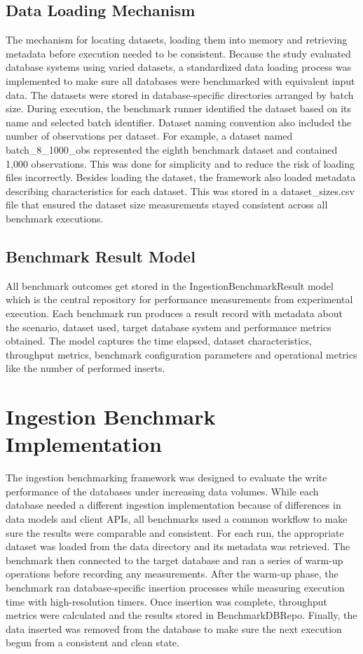 \subsection{Data Loading Mechanism}
The mechanism for locating datasets, loading them into memory and retrieving metadata before execution needed to be consistent. Because the study evaluated database systems using varied datasets, a standardized data loading process was implemented to make sure all databases were benchmarked with equivalent input data. The datasets were stored in database-specific directories arranged by batch size. During execution, the benchmark runner identified the dataset based on its name and selected batch identifier. Dataset naming convention also included the number of observations per dataset. For example, a dataset named batch\_8\_1000\_obs represented the eighth benchmark dataset and contained 1,000 observations. This was done for simplicity and to reduce the risk of loading files incorrectly. Besides loading the dataset, the framework also loaded metadata describing characteristics for each dataset. This was stored in a dataset\_sizes.csv file that ensured the dataset size measurements stayed consistent across all benchmark executions. 

\subsection{Benchmark Result Model}
All benchmark outcomes get stored in the IngestionBenchmarkResult model which is the central repository for performance measurements from experimental execution. Each benchmark run produces a result record with metadata about the scenario, dataset used, target database system and performance metrics obtained. The model captures the time elapsed, dataset characteristics, throughput metrics, benchmark configuration parameters and operational metrics like the number of performed inserts. 

\section{Ingestion Benchmark Implementation}
The ingestion benchmarking framework was designed to evaluate the write performance of the databases under increasing data volumes. While each database needed a different ingestion implementation because of differences in data models and client APIs, all benchmarks used a common workflow to make sure the results were comparable and consistent. For each run, the appropriate dataset was loaded from the data directory and its metadata was retrieved. The benchmark then connected to the target database and ran a series of warm-up operations before recording any measurements. After the warm-up phase, the benchmark ran database-specific insertion processes while measuring execution time with high-resolution timers. Once insertion was complete, throughput metrics were calculated and the results stored in BenchmarkDBRepo. Finally, the data inserted was removed from the database to make sure the next execution begun from a consistent and clean state. 

